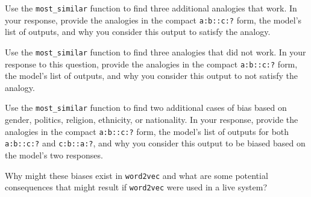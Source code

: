 \documentclass[a4paper,10pt]{article}
\begin{document}
\vspace{5pt}
\begin{taskbox}
 Use the \texttt{most\_similar} function to find three additional analogies that work. In your response, provide the analogies in the compact \texttt{a:b::c:?} form, the model's list of outputs, and why you consider this output to satisfy the analogy.



 Use the \texttt{most\_similar} function to find three analogies that did not work. In your response to this question, provide the analogies in the compact \texttt{a:b::c:?} form, the model's list of outputs, and why you consider this output to not satisfy the analogy.


\end{taskbox}
\vspace{5pt}

\vspace{5pt}
\begin{taskbox}
 Use the \texttt{most\_similar} function to find two additional cases of bias based on gender, politics, religion, ethnicity, or nationality. In your response, provide the analogies in the compact \texttt{a:b::c:?} form, the model's list of outputs for both \texttt{a:b::c:?} and \texttt{c:b::a:?}, and why you consider this output to be biased based on the model's two responses.


 Why might these biases exist in \texttt{word2vec} and what are some potential consequences that might result if \texttt{word2vec} were used in a live system?
\end{taskbox}
\vspace{5pt}
\end{document}
